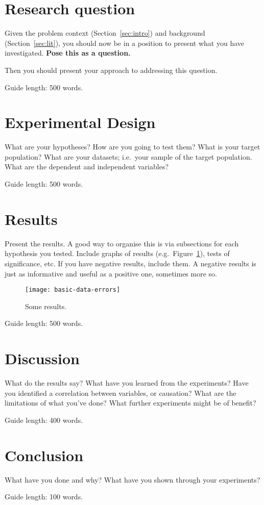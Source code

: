 \documentclass{csfourzero}
\begin{document}
\section{Research question}
\label{sec:rq}

Given the problem context (Section~\ref{sec:intro}) and background
(Section~\ref{sec:lit}), you should now be in a position to present
what you have investigated. \textbf{Pose this as a question.}

Then you should present your approach to addressing this
question.

Guide length: 500 words.

\section{Experimental Design}
\label{sec:exp}

What are your hypotheses? How are you going to test them? What is your
target population? What are your datasets; i.e.\ your sample of the
target population. What are the dependent and independent variables?

Guide length: 500 words.

\section{Results}
\label{sec:results}

Present the results. A good way to organise this is via subsections
for each hypothesis you tested. Include graphs of results
(e.g.\ Figure~\ref{fig:data}), tests of significance, etc. If you have
negative results, include them. A negative results is just as
informative and useful as a positive one, sometimes more so.

\begin{figure}
\centerline{\texttt{[image: basic-data-errors]}}
\caption{Some results.}\label{fig:data}
\end{figure}

Guide length: 500 words.

\section{Discussion}
\label{sec:discuss}

What do the results say? What have you learned from the
experiments? Have you identified a correlation between variables, or
causation? What are the limitations of what you've done? What further
experiments might be of benefit?

Guide length: 400 words.

\section{Conclusion}
\label{sec:conc}

What have you done and why? What have you shown through your
experiments?

Guide length: 100 words.


\end{document}
